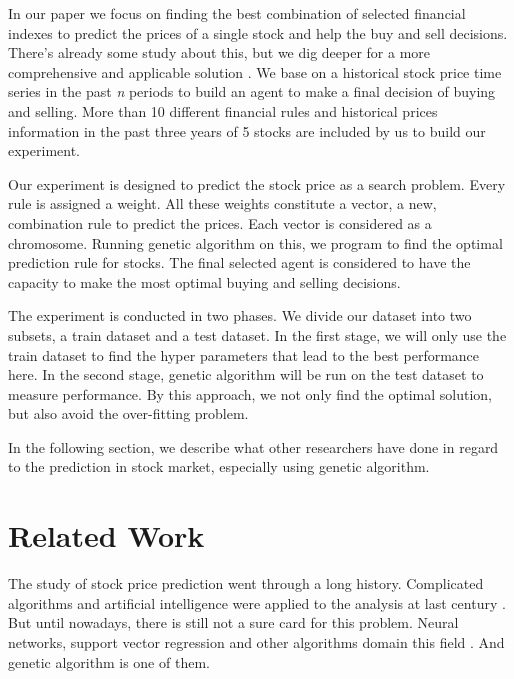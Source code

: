 \documentclass{article}
\begin{document}
In our paper we focus on finding the best combination of selected financial indexes
to predict the prices of a single stock and help the buy and sell decisions.
There's already some study about this, but we dig deeper for a more comprehensive and applicable solution
\cite{genetic-algorithms-for-predicting-the-egyptian-stock-market}
\cite{genetic-algorithms-to-optimise-the-time-to-make-stock-market-investment}.
We base on a historical stock price time series in the past \emph{n} periods
to build an agent to make a final decision of buying and selling.
More than 10 different financial rules and historical prices information
in the past three years of 5 stocks are included by us to build our experiment.

Our experiment is designed to predict the stock price as a search problem.
Every rule is assigned a weight.
All these weights constitute a vector, a new, combination rule to predict the prices.
Each vector is considered as a chromosome.
Running genetic algorithm on this, we program to find the optimal prediction rule for stocks.
The final selected agent is considered to have the capacity to make the most optimal buying and selling decisions.

The experiment is conducted in two phases.
We divide our dataset into two subsets, a train dataset and a test dataset.
In the first stage, we will only use the train dataset to find the hyper parameters that lead to the best performance here.
In the second stage, genetic algorithm will be run on the test dataset to measure performance.
By this approach, we not only find the optimal solution, but also avoid the over-fitting problem.

In the following section,
we describe what other researchers have done in regard to the prediction in stock market,
especially using genetic algorithm.

\section{Related Work}

The study of stock price prediction went through a long history.
Complicated algorithms and artificial intelligence were applied to the analysis at last century
\cite{application-of-neural-network-to-technical-analysis}.
But until nowadays, there is still not a sure card for this problem.
Neural networks, support vector regression and other algorithms domain this field
\cite{textual-analysis-of-stock-market-prediction}.
And genetic algorithm is one of them.
\end{document}
